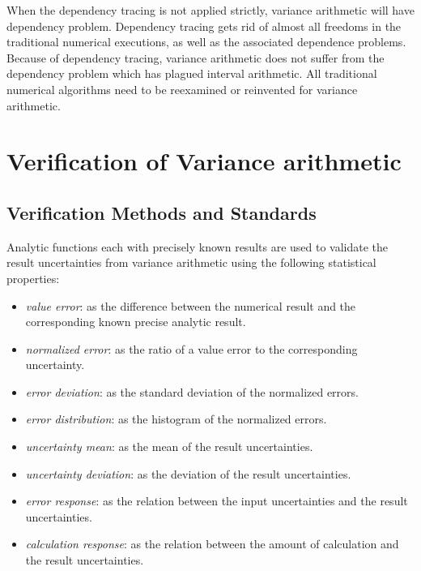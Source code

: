 \documentclass[twoside]{article}
\numberwithin{equation}{section}
\begin{document}
When the dependency tracing is not applied strictly, variance arithmetic will have dependency problem.
Dependency tracing gets rid of almost all freedoms in the traditional numerical executions, as well as the associated dependence problems.
Because of dependency tracing, variance arithmetic does not suffer from the dependency problem \cite{Interval_Arithmetic} which has plagued interval arithmetic.
All traditional numerical algorithms need to be reexamined or reinvented for variance arithmetic.








\clearpage
\section{Verification of Variance arithmetic}
\label{sec: validation}

\subsection{Verification Methods and Standards}

Analytic functions each with precisely known results are used to validate the result uncertainties from variance arithmetic using the following statistical properties: 
\begin{itemize}

\item \emph{value error}: as the difference between the numerical result and the corresponding known precise analytic result.

\item \emph{normalized error}: as the ratio of a value error to the corresponding uncertainty.

\item \emph{error deviation}: as the standard deviation of the normalized errors.

\item \emph{error distribution}: as the histogram of the normalized errors.

\item \emph{uncertainty mean}: as the mean of the result uncertainties.

\item \emph{uncertainty deviation}: as the deviation of the result uncertainties.

\item \emph{error response}: as the relation between the input uncertainties and the result uncertainties.

\item \emph{calculation response}: as the relation between the amount of calculation and the result uncertainties.

\end{itemize}
\end{document}
